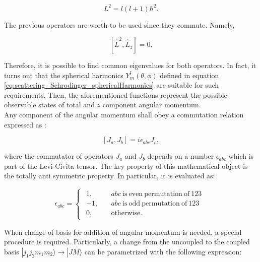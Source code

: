 \documentclass[openany]{book}
\begin{document}
\begin{equation} \label{eq:angularMomentum_L2}
	L^2 = l(l+1)\hbar^2. 
\end{equation}

The previous operators are worth to be used since they commute. Namely, 

\begin{equation} \label{eq:angularMomentum_commutator}
	[\hat L^2, \hat L_z] = 0.
\end{equation}

Therefore, it is possible to find common eigenvalues for both operators. In fact, it turns out that the spherical harmonics $Y^{l}_m(\theta, \phi)$ defined in equation \ref{eq:scattering_Schrodinger_sphericalHarmonics} are suitable for such requirements. Then, the aforementioned functions represent the possible observable states of total and $z$ component angular momentum.  \\

Any component of the angular momentum shall obey a commutation relation expressed as \cite{dick_2016}: 

\begin{equation} \label{eq:angularMomentum_conmutation}
	[J_a, J_b]  = i \epsilon_{abc} J_c,
\end{equation}

where the commutator of operators $J_a$ and $J_b$ depends on a number $\epsilon_{abc}$ which is part of the Levi-Civita tensor. The key property of this mathematical object is the totally anti symmetric property. In particular, it is evaluated as:

\begin{equation} \label{eq:angularMomentum_LeviCivitaTensor}
	\epsilon_{abc} = 	\left\{\begin{array}{l}
		\begin{split}
			1, \quad &abc\mathrm{\ is \ even \ permutation \ of \ 123} \\ 
			-1, \quad &abc\mathrm{\ is \ odd \ permutation \ of \ 123} \\
			0,	\quad &\mathrm{otherwise.}
		\end{split}
	\end{array}\right.
\end{equation}

When change of basis for addition of angular momentum is needed, a special procedure is required. Particularly, a change from the uncoupled to the coupled basis $|j_1j_2m_1m_2 \rangle \rightarrow |JM \rangle$ can be parametrized with the following expression:
\end{document}
